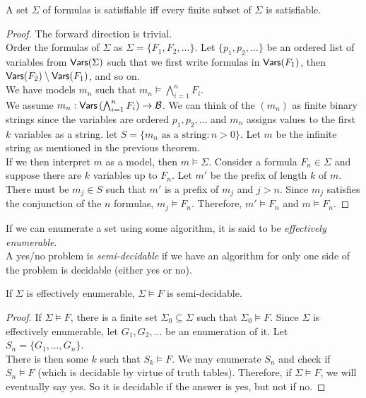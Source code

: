 \begin{theorem}
	A set $\Sigma$ of formulas is satisfiable iff every finite subset of $\Sigma$ is satisfiable.
\end{theorem}

\begin{proof}
	The forward direction is trivial.\\
	Order the formulas of $\Sigma$ as $\Sigma=\{F_1,F_2,\ldots\}$. Let $\{p_1,p_2,\ldots\}$ be an ordered list of variables from $\mathsf{Vars}(\Sigma)$ such that we first write formulas in $\mathsf{Vars}(F_1)$, then $\mathsf{Vars}(F_2)\setminus\mathsf{Vars}(F_1)$, and so on.\\
	We have models $m_n$ such that $m_n\vDash\bigwedge_{i=1}^n F_i$.\\
	We assume $m_n : \mathsf{Vars}\left(\bigwedge_{i=1}^n F_i\right)\to\mathcal{B}$. We can think of the $(m_n)$ as finite binary strings since the variables are ordered $p_1,p_2,\ldots$ and $m_n$ assigns values to the first $k$ variables as a string. let $S=\{m_n\text{ as a string}:n>0\}$. Let $m$ be the infinite string as mentioned in the previous theorem.\\
	If we then interpret $m$ as a model, then $m\vDash\Sigma$. Consider a formula $F_n\in\Sigma$ and suppose there are $k$ variables up to $F_n$. Let $m'$ be the prefix of length $k$ of $m$. There must be $m_j\in S$ such that $m'$ is a prefix of $m_j$ and $j>n$. Since $m_j$ satisfies the conjunction of the $n$ formulas, $m_j\vDash F_n$. Therefore, $m'\vDash F_n$ and $m\vDash F_n$. 
\end{proof}

If we can enumerate a set using some algorithm, it is said to be \textit{effectively enumerable}.\\

A yes/no problem is \textit{semi-decidable} if we have an algorithm for only one side of the problem is decidable (either yes or no).

\begin{theorem}
	If $\Sigma$ is effectively enumerable, $\Sigma\vDash F$ is semi-decidable.
\end{theorem}
\begin{proof}
	If $\Sigma\vDash F$, there is a finite set $\Sigma_0\subseteq\Sigma$ such that $\Sigma_0\vDash F$. Since $\Sigma$ is effectively enumerable, let $G_1,G_2,\ldots$ be an enumeration of it. Let $S_n = \{G_1,\ldots,G_n\}$.\\
	There is then some $k$ such that $S_k\vDash F$. We may enumerate $S_n$ and check if $S_n\vDash F$ (which is decidable by virtue of truth tables). Therefore, if $\Sigma\vDash F$, we will eventually say yes. So it is decidable if the answer is yes, but not if no.
\end{proof}